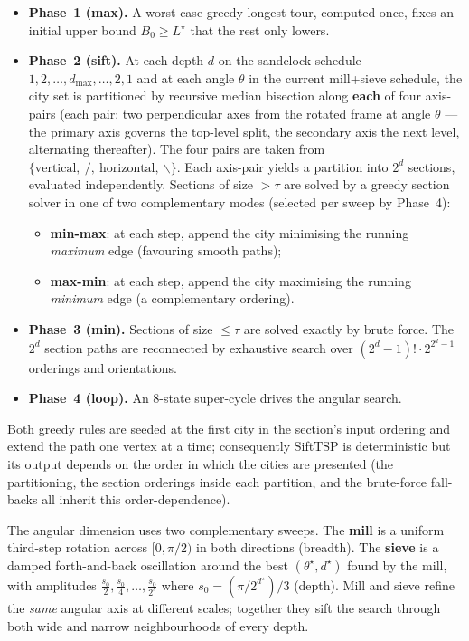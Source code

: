 \documentclass[11pt,a4paper]{article}
\begin{document}
\begin{itemize}
\item \textbf{Phase~1 (max).} A worst-case greedy-longest tour, computed
once, fixes an initial upper bound $B_0 \geq L^{\star}$ that the rest only
lowers.

\item \textbf{Phase~2 (sift).} At each depth $d$ on the sandclock
schedule $1, 2, \dots, d_{\max}, \dots, 2, 1$ and at each angle $\theta$
in the current mill+sieve schedule, the city set is partitioned by
recursive median bisection along \textbf{each} of four axis-pairs (each
pair: two perpendicular axes from the rotated frame at angle $\theta$
--- the primary axis governs the top-level split, the secondary axis the
next level, alternating thereafter). The four pairs are taken from
$\{\text{vertical},\ /,\ \text{horizontal},\ \backslash\}$. Each
axis-pair yields a partition into $2^d$ sections, evaluated
independently. Sections of size $> \tau$ are solved by a greedy section
solver in one of two complementary modes (selected per sweep by
Phase~4):
\begin{itemize}
\item \textbf{min-max}: at each step, append the city minimising the
running \emph{maximum} edge (favouring smooth paths);
\item \textbf{max-min}: at each step, append the city maximising the
running \emph{minimum} edge (a complementary ordering).
\end{itemize}

\item \textbf{Phase~3 (min).} Sections of size $\leq \tau$ are solved
exactly by brute force. The $2^d$ section paths are reconnected by
exhaustive search over $(2^d - 1)! \cdot 2^{2^d - 1}$ orderings and
orientations.

\item \textbf{Phase~4 (loop).} An 8-state super-cycle drives the angular
search.
\end{itemize}

Both greedy rules are seeded at the first city in the section's input
ordering and extend the path one vertex at a time; consequently SiftTSP
is deterministic but its output depends on the order in which the
cities are presented (the partitioning, the section orderings inside
each partition, and the brute-force fall-backs all inherit this
order-dependence).

The angular dimension uses two complementary sweeps. The \textbf{mill}
is a uniform third-step rotation across $[0, \pi/2)$ in both directions
(breadth). The \textbf{sieve} is a damped forth-and-back oscillation
around the best $(\theta^{\star}, d^{\star})$ found by the mill, with
amplitudes $\tfrac{s_0}{2}, \tfrac{s_0}{4}, \dots, \tfrac{s_0}{2^{s}}$
where $s_0 = (\pi / 2^{d^{\star}}) / 3$ (depth). Mill and sieve refine
the \emph{same} angular axis at different scales; together they sift
the search through both wide and narrow neighbourhoods of every depth.
\end{document}
